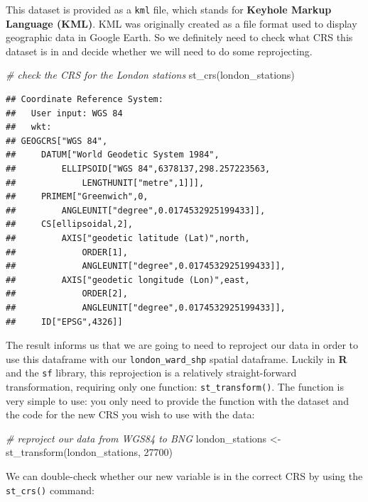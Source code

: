 \documentclass[
]{book}
\newenvironment{Shaded}{\begin{snugshade}}{\end{snugshade}}
\newcommand{\CommentTok}[1]{\textcolor[rgb]{0.56,0.35,0.01}{\textit{#1}}}
\newcommand{\DecValTok}[1]{\textcolor[rgb]{0.00,0.00,0.81}{#1}}
\newcommand{\FunctionTok}[1]{\textcolor[rgb]{0.00,0.00,0.00}{#1}}
\newcommand{\NormalTok}[1]{#1}
\newcommand{\OtherTok}[1]{\textcolor[rgb]{0.56,0.35,0.01}{#1}}
\begin{document}
This dataset is provided as a \texttt{kml} file, which stands for \textbf{Keyhole Markup Language (KML)}. KML was originally created as a file format used to display geographic data in Google Earth. So we definitely need to check what CRS this dataset is in and decide whether we will need to do some reprojecting.

\begin{Shaded}
\begin{Highlighting}[]
\CommentTok{\# check the CRS for the London stations}
\FunctionTok{st\_crs}\NormalTok{(london\_stations)}
\end{Highlighting}
\end{Shaded}

\begin{verbatim}
## Coordinate Reference System:
##   User input: WGS 84 
##   wkt:
## GEOGCRS["WGS 84",
##     DATUM["World Geodetic System 1984",
##         ELLIPSOID["WGS 84",6378137,298.257223563,
##             LENGTHUNIT["metre",1]]],
##     PRIMEM["Greenwich",0,
##         ANGLEUNIT["degree",0.0174532925199433]],
##     CS[ellipsoidal,2],
##         AXIS["geodetic latitude (Lat)",north,
##             ORDER[1],
##             ANGLEUNIT["degree",0.0174532925199433]],
##         AXIS["geodetic longitude (Lon)",east,
##             ORDER[2],
##             ANGLEUNIT["degree",0.0174532925199433]],
##     ID["EPSG",4326]]
\end{verbatim}

The result informs us that we are going to need to reproject our data in order to use this dataframe with our \texttt{london\_ward\_shp} spatial dataframe. Luckily in \textbf{R} and the \texttt{sf} library, this reprojection is a relatively straight-forward transformation, requiring only one function: \texttt{st\_transform()}. The function is very simple to use: you only need to provide the function with the dataset and the code for the new CRS you wish to use with the data:

\begin{Shaded}
\begin{Highlighting}[]
\CommentTok{\# reproject our data from WGS84 to BNG}
\NormalTok{london\_stations }\OtherTok{\textless{}{-}} \FunctionTok{st\_transform}\NormalTok{(london\_stations, }\DecValTok{27700}\NormalTok{)}
\end{Highlighting}
\end{Shaded}

We can double-check whether our new variable is in the correct CRS by using the \texttt{st\_crs()} command:
\end{document}
